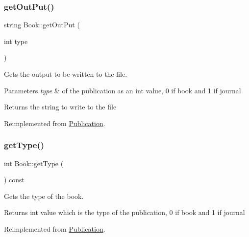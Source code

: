 \subsubsection{\texorpdfstring{get\+Out\+Put()}{getOutPut()}}
{\footnotesize\ttfamily string Book\+::get\+Out\+Put (\begin{DoxyParamCaption}\item[{int}]{type }\end{DoxyParamCaption})\hspace{0.3cm}{\ttfamily [virtual]}}



Gets the output to be written to the file. 


\begin{DoxyParams}{Parameters}
{\em type} & of the publication as an int value, 0 if book and 1 if journal\\
\hline
\end{DoxyParams}
\begin{DoxyReturn}{Returns}
the string to write to the file 
\end{DoxyReturn}


Reimplemented from \hyperlink{class_publication_af382f9557807e8375478ceb7890e841f}{Publication}.

\mbox{\label{class_book_a285dd3654bfced6baffd86320c39d42e}} 
\subsubsection{\texorpdfstring{get\+Type()}{getType()}}
{\footnotesize\ttfamily int Book\+::get\+Type (\begin{DoxyParamCaption}{ }\end{DoxyParamCaption}) const\hspace{0.3cm}{\ttfamily [virtual]}}



Gets the type of the book. 

\begin{DoxyReturn}{Returns}
int value which is the type of the publication, 0 if book and 1 if journal 
\end{DoxyReturn}


Reimplemented from \hyperlink{class_publication_ab0bd9119b29b09fbbe9044016a512407}{Publication}.

\mbox{\label{class_book_a8368f243d8a645444e8019760a50cc8b}} 
